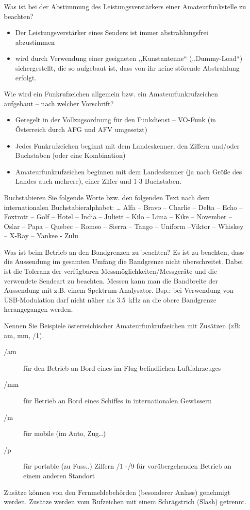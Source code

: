 \documentclass[avery5371,grid,frame,a4paper]{flashcards}
\newcommand{\card}[3]{
  \begin{flashcard}[{\chap} -- #1]{#2}#3\end{flashcard}
}
\begin{document}
\card{49}{Was ist bei der Abstimmung des Leistungsverstärkers einer Amateurfunkstelle zu beachten?}{
  \begin{itemize}
    \item Der Leistungsverstärker eines Senders ist immer abstrahlungsfrei abzustimmen
    \item wird durch Verwendung einer geeigneten ,,Kunstantenne`` (,,Dummy-Load``) sichergestellt, die so aufgebaut ist, dass von ihr keine störende Abstrahlung erfolgt.
  \end{itemize}
}
\card{50}{Wie wird ein Funkrufzeichen allgemein bzw. ein Amateurfunkrufzeichen aufgebaut – nach welcher Vorschrift?}{
  \begin{itemize}
    \item Geregelt in der Vollzugsordnung für den Funkdienst – VO-Funk (in Österreich durch AFG und AFV umgesetzt)
    \item Jedes Funkrufzeichen beginnt mit dem Landeskenner, den Ziffern und/oder Buchstaben (oder eine Kombination)
    \item Amateurfunkrufzeichen beginnen mit dem Landeskenner (ja nach Größe des Landes auch mehrere), einer Ziffer und 1-3 Buchstaben.
  \end{itemize}
}
\card{51}{Buchstabieren Sie folgende Worte bzw. den folgenden Text nach dem internationalen Buchstabieralphabet: \dots}{
  Alfa – Bravo – Charlie – Delta – Echo – Foxtrott – Golf – Hotel – India – Juliett – Kilo – Lima – Kike – November – Oslar – Papa – Quebec – Romeo – Sierra – Tango – Uniform –Viktor – Whiskey – X-Ray – Yankee - Zulu
}
\card{52}{Was ist beim Betrieb an den Bandgrenzen zu beachten?}{
  Es ist zu beachten, dass die Aussendung im gesamten Umfang die Bandgrenze nicht überschreitet. Dabei ist die Toleranz der verfügbaren Messmöglichkeiten/Messgeräte und die verwendete Sendeart zu beachten. Messen kann man die Bandbreite der Aussendung mit z.B. einem Spektrum-Analysator.
  Bsp.: bei Verwendung von USB-Modulation darf nicht näher als \SI{3,5}{\kilo\Hz} an die obere Bandgrenze herangegangen werden.
}
\card{53}{Nennen Sie Beispiele österreichischer Amateurfunkrufzeichen mit Zusätzen (zB: am, mm, /1).}{
  \footnotesize
  \begin{description}
    \item[/am] für den Betrieb an Bord eines im Flug befindlichen Luftfahrzeuges
    \item[/mm] für Betrieb an Bord eines Schiffes in internationalen Gewässern
    \item[/m] für mobile (im Auto, Zug…)
    \item[/p] für portable (zu Fuss..)  Ziffern /1 -/9 für vorübergehenden Betrieb an einem anderen Standort
  \end{description}
  Zusätze können von den Fernmeldebehörden (besonderer Anlass) genehmigt werden.
  Zusätze werden vom Rufzeichen mit einem Schrägstrich (Slash) getrennt.
}
\end{document}
